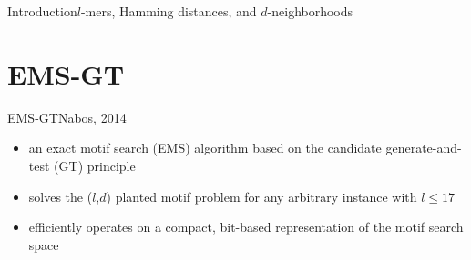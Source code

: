 \documentclass[pdf,xcolor={dvipsnames}]{beamer}
\begin{document}
\begin{frame}{Introduction}{$l$-mers, Hamming distances, and $d$-neighborhoods}
\begin{itemize}
		\end{itemize}
		\end{frame}

\section{EMS-GT}
	\begin{frame}{EMS-GT}{Nabos, 2014}
		\begin{itemize}
		\item an exact motif search (EMS) algorithm based on the candidate generate-and-test (GT) principle\newline
		\item solves the ($l$,$d$) planted motif problem for any arbitrary instance with $l \leq 17$ \newline
		\item efficiently operates on a compact, bit-based representation of the motif search space
		\end{itemize}
		\end{frame}
\end{document}
